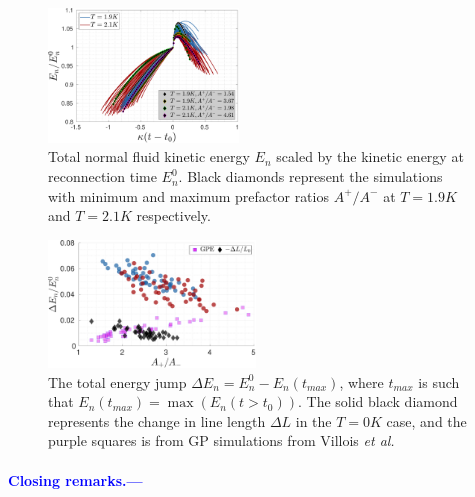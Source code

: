 \documentclass[%
 reprint,
 amsmath,amssymb,
 aps,
 prl,
]{revtex4-2}
\newcommand{\etal}{{\it et al.}~}
\def\blue#1{\textcolor{blue}{#1}}
\begin{document}
\blue{\blindtext[2]}
\begin{figure}
	\centering
	\includegraphics*[width=0.45\textwidth]{energy-evolution.pdf}
	\caption{Total normal fluid kinetic energy $E_n$ scaled by the kinetic energy at reconnection time $E_n^0$. Black diamonds represent the simulations with minimum and maximum prefactor ratios $A^+/A^-$ at $T=1.9K$ and $T=2.1K$ respectively.}
\end{figure}

\begin{figure}
	\centering
	\includegraphics*[width=0.49\textwidth]{energy-jump.pdf}
	\caption{The total energy jump $\Delta E_n = E_n^0 - E_n(t_{max})$, where $t_{max}$ is such that $E_n(t_{max}) = \max(E_n(t>t_0))$. The solid black diamond represents the change in line length $\Delta L$ in the $T=0K$ case, and the purple squares is from GP simulations from Villois \etal \cite{villoisIrreversibleDynamicsVortex2020}}
\end{figure}

\blue{
\paragraph*{Closing remarks.---}
\blindtext
}

\end{document}

